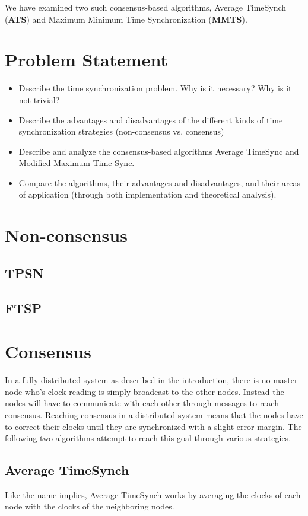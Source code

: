 \documentclass[a0,24pt]{sciposter}
\begin{document}
\begin{multicols}{2}
We have examined two such consensus-based algorithms, Average TimeSynch (\textbf{ATS}) and Maximum Minimum Time Synchronization (\textbf{MMTS}).

\section{Problem Statement}
\begin{itemize}
    \item Describe the time synchronization problem. Why is it necessary? Why is it not trivial? 
    \item Describe the advantages and disadvantages of the different kinds of time synchronization strategies (non-consensus vs. consensus)
    \item Describe and analyze the consensus-based algorithms Average TimeSync and Modified Maximum Time Sync.
    \item Compare the algorithms, their advantages and disadvantages, and their areas of application (through both implementation and theoretical analysis).
\end{itemize}

\section{Non-consensus}

\subsection{TPSN}

\subsection{FTSP}

\section{Consensus}
In a fully distributed system as described in the introduction, there is no master node who's clock reading is simply broadcast to the other nodes. Instead the nodes will have to communicate with each other through messages to reach consensus. Reaching consensus in a distributed system means that the nodes have to correct their clocks until they are synchronized with a slight error margin. The following two algorithms attempt to reach this goal through various strategies.

\subsection{Average TimeSynch}
Like the name implies, Average TimeSynch works by averaging the clocks of each node with the clocks of the neighboring nodes.


\end{multicols}
\end{document}
